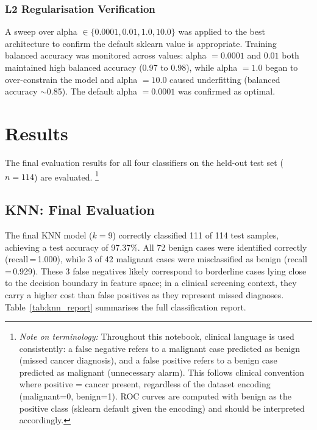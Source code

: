 \documentclass[twocolumn, fontsize=10pt]{article}
\begin{document}
\subsubsection{L2 Regularisation Verification}

A sweep over alpha $\in \{0.0001, 0.01, 1.0, 10.0\}$ was applied to the best architecture to confirm the default sklearn value is appropriate. Training balanced accuracy was monitored across values: alpha $= 0.0001$ and $0.01$ both maintained high balanced accuracy (0.97 to 0.98), while alpha $= 1.0$ began to over-constrain the model and alpha $= 10.0$ caused underfitting (balanced accuracy $\sim$0.85). The default alpha $= 0.0001$ was confirmed as optimal.


\section{Results}
\label{sec:results}

The final evaluation results for all four classifiers on the held-out test set ($n = 114$) are evaluated. \footnote{\textit{Note on terminology:} Throughout this notebook, clinical language is used consistently: a false negative refers to a malignant case predicted as benign (missed cancer diagnosis), and a false positive refers to a benign case predicted as malignant (unnecessary alarm). This follows clinical convention where positive = cancer present, regardless of the dataset encoding (malignant=0, benign=1). ROC curves are computed with benign as the positive class (sklearn default given the encoding) and should be interpreted accordingly. 
}

\subsection{KNN: Final Evaluation}

The final KNN model ($k = 9$) correctly classified 111 of 114 test samples,
achieving a test accuracy of 97.37\%. All 72 benign cases were identified
correctly (recall\,=\,1.000), while 3 of 42 malignant cases were misclassified
as benign (recall\,=\,0.929). These 3 false negatives likely correspond to borderline cases lying close
to the decision boundary in feature space; in a clinical screening context,
they carry a higher cost than false positives as they represent missed diagnoses.
Table~\ref{tab:knn_report} summarises the full classification report.
\end{document}
